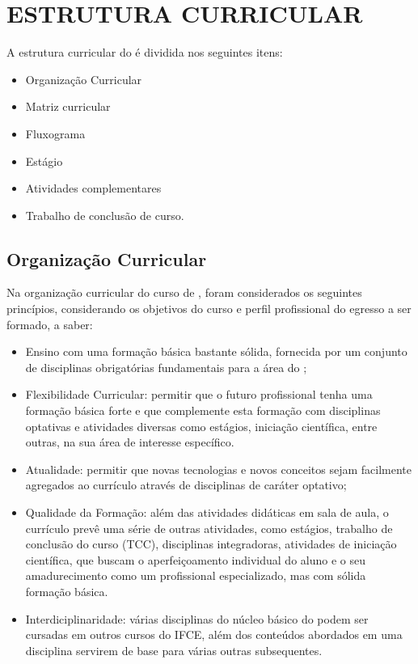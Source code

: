 
\clearpage\section{ESTRUTURA CURRICULAR}
A estrutura curricular do \NOMECURSO é dividida nos seguintes itens: 

\begin{itemize}
	\item Organização Curricular 
	\item Matriz curricular 
	\item Fluxograma
	\item Estágio
	\item Atividades complementares 
	\item Trabalho de conclusão de curso. 
\end{itemize}

\subsection{Organização Curricular}
Na organização curricular do curso de \NOMECURSO, foram considerados os seguintes princípios, considerando os objetivos do curso e perfil profissional do egresso a ser formado, a saber: 
\begin{itemize}
	\item Ensino com uma formação básica bastante sólida, fornecida por um conjunto de disciplinas obrigatórias fundamentais para a área do \NOMECURSO ;
	\item Flexibilidade Curricular: permitir que o futuro profissional tenha uma formação básica forte e que complemente esta formação com disciplinas optativas e atividades diversas como estágios, iniciação científica, entre outras, na sua área de interesse específico.
	\item Atualidade: permitir que novas tecnologias e novos conceitos sejam facilmente agregados ao currículo através de disciplinas de caráter optativo;
	\item Qualidade da Formação: além das atividades didáticas em sala de aula, o currículo prevê uma série de outras atividades, como estágios, trabalho de conclusão do curso (TCC), disciplinas integradoras, atividades de iniciação científica, que buscam o aperfeiçoamento individual do aluno e o seu amadurecimento como um profissional especializado, mas com sólida formação básica.
	\item Interdiciplinaridade: várias disciplinas do núcleo básico do \NOMECURSO podem ser cursadas em outros cursos do IFCE, além dos conteúdos abordados em uma disciplina servirem de base para várias outras subsequentes.
\end{itemize}


